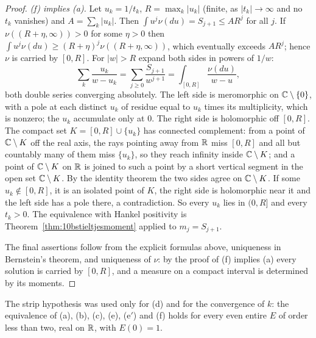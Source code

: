 \begin{proof}
\emph{(f) implies (a).} Let $u_k = 1/t_k$, $R = \max_k|u_k|$ (finite, as $|t_k|\to\infty$ and no $t_k$ vanishes) and $A = \sum_k|u_k|$. Then $\int u^j\nu(du) = S_{j+1}\le AR^j$ for all $j$. If $\nu((R+\eta,\infty))>0$ for some $\eta>0$ then $\int u^j\nu(du)\ge(R+\eta)^j\nu((R+\eta,\infty))$, which eventually exceeds $AR^j$; hence $\nu$ is carried by $[0,R]$. For $|w|>R$ expand both sides in powers of $1/w$:
\[
\sum_k\frac{u_k}{w-u_k} = \sum_{j\ge0}\frac{S_{j+1}}{w^{j+1}} = \int_{[0,R]}\frac{\nu(du)}{w-u},
\]
both double series converging absolutely. The left side is meromorphic on $\mathbb{C}\setminus\{0\}$, with a pole at each distinct $u_k$ of residue equal to $u_k$ times its multiplicity, which is nonzero; the $u_k$ accumulate only at $0$. The right side is holomorphic off $[0,R]$. The compact set $K = [0,R]\cup\{u_k\}$ has connected complement: from a point of $\mathbb{C}\setminus K$ off the real axis, the rays pointing away from $\mathbb{R}$ miss $[0,R]$ and all but countably many of them miss $\{u_k\}$, so they reach infinity inside $\mathbb{C}\setminus K$; and a point of $\mathbb{C}\setminus K$ on $\mathbb{R}$ is joined to such a point by a short vertical segment in the open set $\mathbb{C}\setminus K$. By the identity theorem the two sides agree on $\mathbb{C}\setminus K$. If some $u_k\notin[0,R]$, it is an isolated point of $K$, the right side is holomorphic near it and the left side has a pole there, a contradiction. So every $u_k$ lies in $(0,R]$ and every $t_k>0$. The equivalence with Hankel positivity is Theorem~\ref{thm:10bstieltjesmoment} applied to $m_j = S_{j+1}$.

The final assertions follow from the explicit formulas above, uniqueness in Bernstein's theorem, and uniqueness of $\nu$: by the proof of (f) implies (a) every solution is carried by $[0,R]$, and a measure on a compact interval is determined by its moments.
\end{proof}

The strip hypothesis was used only for (d) and for the convergence of $k$: the equivalence of (a), (b), (c), (e), (e$'$) and (f) holds for every even entire $E$ of order less than two, real on $\mathbb{R}$, with $E(0)=1$.

